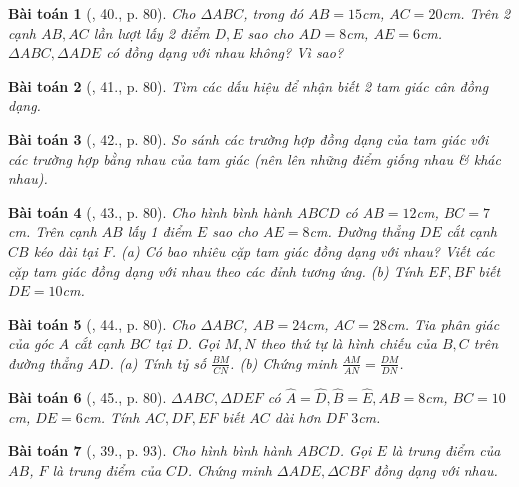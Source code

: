 \documentclass{article}
\newtheorem{baitoan}{Bài toán}
\begin{document}
\begin{baitoan}[\cite{SGK_Toan_8_tap_2}, 40., p. 80]
	Cho $\Delta ABC$, trong đó $AB = 15$\emph{cm}, $AC = 20$\emph{cm}. Trên 2 cạnh $AB,AC$ lần lượt lấy 2 điểm $D,E$ sao cho $AD = 8$\emph{cm}, $AE = 6$\emph{cm}. $\Delta ABC,\Delta ADE$ có đồng dạng với nhau không? Vì sao?	
\end{baitoan}

\begin{baitoan}[\cite{SGK_Toan_8_tap_2}, 41., p. 80]
	Tìm các dấu hiệu để nhận biết 2 tam giác cân đồng dạng.
\end{baitoan}

\begin{baitoan}[\cite{SGK_Toan_8_tap_2}, 42., p. 80]
	So sánh các trường hợp đồng dạng của tam giác với các trường hợp bằng nhau của tam giác (nên lên những điểm giống nhau \& khác nhau).
\end{baitoan}

\begin{baitoan}[\cite{SGK_Toan_8_tap_2}, 43., p. 80]
	Cho hình bình hành $ABCD$ có $AB = 12$\emph{cm}, $BC = 7$\emph{cm}. Trên cạnh $AB$ lấy 1 điểm $E$ sao cho $AE = 8$\emph{cm}. Đường thẳng $DE$ cắt cạnh $CB$ kéo dài tại $F$. (a) Có bao nhiêu cặp tam giác đồng dạng với nhau? Viết các cặp tam giác đồng dạng với nhau theo các đỉnh tương ứng. (b) Tính $EF,BF$ biết $DE = 10$\emph{cm}.
\end{baitoan}

\begin{baitoan}[\cite{SGK_Toan_8_tap_2}, 44., p. 80]
	Cho $\Delta ABC$, $AB = 24$\emph{cm}, $AC = 28$\emph{cm}. Tia phân giác của góc $A$ cắt cạnh $BC$ tại $D$. Gọi $M,N$ theo thứ tự là hình chiếu của $B,C$ trên đường thẳng $AD$. (a) Tính tỷ số $\frac{BM}{CN}$. (b) Chứng minh $\frac{AM}{AN} = \frac{DM}{DN}$.
\end{baitoan}

\begin{baitoan}[\cite{SGK_Toan_8_tap_2}, 45., p. 80]
	$\Delta ABC,\Delta DEF$ có $\widehat{A} = \widehat{D}, \widehat{B} = \widehat{E}, AB = 8$\emph{cm}, $BC = 10$\emph{cm}, $DE = 6$\emph{cm}. Tính $AC,DF,EF$ biết $AC$ dài hơn $DF$ $3$\emph{cm}.	
\end{baitoan}

\begin{baitoan}[\cite{SBT_Toan_8_tap_2}, 39., p. 93]
	Cho hình bình hành $ABCD$. Gọi $E$ là trung điểm của $AB$, $F$ là trung điểm của $CD$. Chứng minh $\Delta ADE,\Delta CBF$ đồng dạng với nhau.
\end{baitoan}
\end{document}
